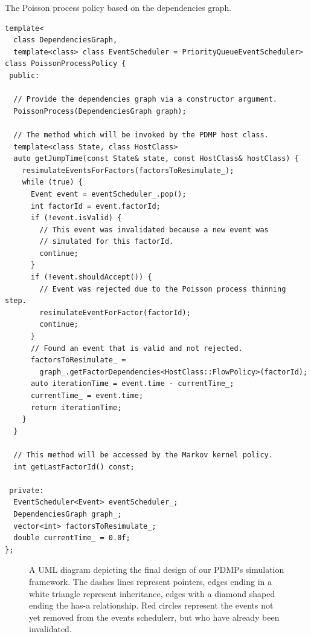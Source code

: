 \documentclass[report.tex]{subfiles}
\begin{document}
\begin{lstfloat}
\caption{The Poisson process policy based on the dependencies graph.}
\label{main-poisson-process-policy-implementation}
\begin{lstlisting}
template<
  class DependenciesGraph,
  template<class> class EventScheduler = PriorityQueueEventScheduler>
class PoissonProcessPolicy {
 public:

  // Provide the dependencies graph via a constructor argument.
  PoissonProcess(DependenciesGraph graph);

  // The method which will be invoked by the PDMP host class.
  template<class State, class HostClass>
  auto getJumpTime(const State& state, const HostClass& hostClass) {
    resimulateEventsForFactors(factorsToResimulate_);
    while (true) {
      Event event = eventScheduler_.pop();
      int factorId = event.factorId;
      if (!event.isValid) {
        // This event was invalidated because a new event was
        // simulated for this factorId.
        continue;
      }
      if (!event.shouldAccept()) {
        // Event was rejected due to the Poisson process thinning step.
        resimulateEventForFactor(factorId);
        continue;
      }
      // Found an event that is valid and not rejected.
      factorsToResimulate_ =
        graph_.getFactorDependencies<HostClass::FlowPolicy>(factorId);
      auto iterationTime = event.time - currentTime_;
      currentTime_ = event.time;
      return iterationTime;
    }
  }

  // This method will be accessed by the Markov kernel policy.
  int getLastFactorId() const;

 private:
  EventScheduler<Event> eventScheduler_;
  DependenciesGraph graph_;
  vector<int> factorsToResimulate_;
  double currentTime_ = 0.0f;
};
\end{lstlisting}
\end{lstfloat}


\begin{figure}
  \centering
  \def\svgwidth{.95\linewidth}
  
  \caption{A UML diagram depicting the final design of our PDMPs simulation framework.
           The dashes lines represent pointers, edges ending in a white triangle
           represent inheritance, edges with a diamond shaped ending the
           has-a relationship. Red circles represent the events not yet removed
           from the events schedulerr, but who have already been invalidated.}
  \label{image-uml-diagram-dependencies-graph-based-design}
\end{figure}
\end{document}
